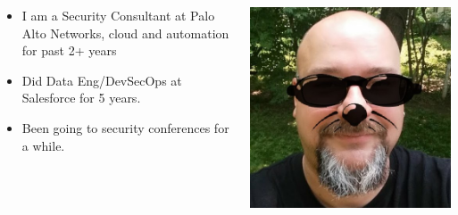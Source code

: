 \documentclass[aspectratio=169]{beamer} %
\begin{document}
\begin{frame}{}
    \begin{columns}
        \begin{column}{0.5\textwidth}
            \begin{itemize}
                \item I am a Security Consultant at Palo Alto Networks, cloud and automation for past 2+ years
                \item Did Data Eng/DevSecOps at Salesforce for 5 years.
            \item Been going to security conferences for a while.
            \end{itemize}
        \end{column}
        \begin{column}{0.45\textwidth}
            \begin{center}
            \includegraphics[width=1.0\linewidth, height=0.7\textheight]{../images/me.jpg}
            \end{center}
        \end{column}
    \end{columns}
\end{frame}
\end{document}
